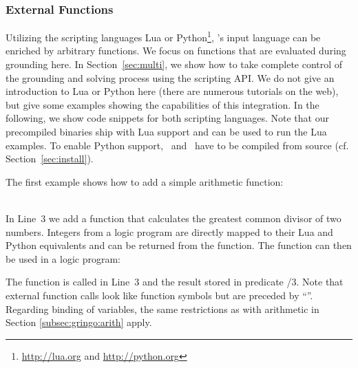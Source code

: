 \subsubsection{External Functions}\label{subsec:lang:extfun}
%
%
%
%
Utilizing the scripting languages Lua or Python\footnote{\url{http://lua.org} and \url{http://python.org}},
\gringo's input language can be enriched by arbitrary functions.
We focus on functions that are evaluated during grounding here.
In Section~\ref{sec:multi},
we show how to take complete control of the grounding and solving process using the scripting API.
We do not give an introduction to Lua or Python here (there are numerous tutorials on the web),
but give some examples showing the capabilities of this integration.
In the following, we show code snippets for both scripting languages.
Note that our precompiled binaries ship with Lua support and can be used to run the Lua examples.
To enable Python support, \gringo\ and \clingo\ have to be compiled from source (cf. Section~\ref{sec:install}).
\begin{example}\label{ex:gcd}
The first example shows how to add a simple arithmetic function:
\\[-8pt] %
\begin{minipage}[t]{0.51\textwidth}

\end{minipage}
\begin{minipage}[t]{0.51\textwidth}

\end{minipage}\\
In Line~3 we add a function that calculates the greatest common divisor of two numbers.
Integers from a logic program are directly mapped to their Lua and Python equivalents
and can be returned from the function.
The  function can then be used in a logic program:

%
%
The function is called in Line~3 and the result stored in predicate /$3$.
Note that external function calls look like function symbols but are preceded by ``''.
%
Regarding binding of variables, the same restrictions as with arithmetic in Section \ref{subsec:gringo:arith} apply.
\end{example}


